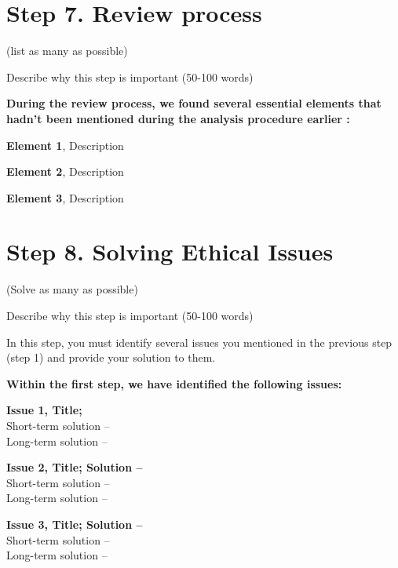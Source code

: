 \documentclass[12pt,a4paper]{article}
\begin{document}
\section{Step 7. Review process}
(list as many as possible)

\vspace{0.3cm}
\noindent Describe why this step is important (50-100 words)

\vspace{0.3cm}
\noindent \textbf{During the review process, we found several essential elements that hadn’t been mentioned during the analysis procedure earlier :}

\vspace{0.3cm}
\noindent \textbf{Element 1}, Description

\vspace{0.3cm}
\noindent \textbf{Element 2}, Description

\vspace{0.3cm}
\noindent \textbf{Element 3}, Description

\section{Step 8. Solving Ethical Issues}
(Solve as many as possible)

\vspace{0.3cm}
\noindent Describe why this step is important (50-100 words)

\vspace{0.3cm}
\noindent In this step, you must identify several issues you mentioned in the previous step (step 1) and provide your solution to them.

\vspace{0.3cm}
\noindent \textbf{Within the first step, we have identified the following issues:}

\vspace{0.3cm}
\noindent \textbf{Issue 1, Title;}\\
Short-term solution -- \\
Long-term solution -- 

\vspace{0.3cm}
\noindent \textbf{Issue 2, Title; Solution --}\\
Short-term solution -- \\
Long-term solution -- 

\vspace{0.3cm}
\noindent \textbf{Issue 3, Title; Solution --}\\
Short-term solution -- \\
Long-term solution -- 
\end{document}

